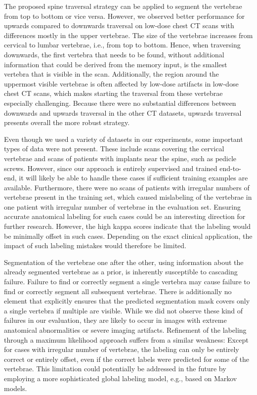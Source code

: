 \documentclass[authoryear,5p,final,times]{elsarticle}
\begin{document}
    The proposed spine traversal strategy can be applied to segment the vertebrae from top to bottom or vice versa. However, we observed better performance for upwards compared to downwards traversal on low-dose chest CT scans with differences mostly in the upper vertebrae. The size of the vertebrae increases from cervical to lumbar vertebrae, i.e., from top to bottom. Hence, when traversing downwards, the first vertebra that needs to be found, without additional information that could be derived from the memory input, is the smallest vertebra that is visible in the scan. Additionally, the region around the uppermost visible vertebrae is often affected by low-dose artifacts in low-dose chest CT scans, which makes starting the traversal from these vertebrae especially challenging. Because there were no substantial differences between downwards and upwards traversal in the other CT datasets, upwards traversal presents overall the more robust strategy.
    
    Even though we used a variety of datasets in our experiments, some important types of data were not present. These include scans covering the cervical vertebrae and scans of patients with implants near the spine, such as pedicle screws. However, since our approach is entirely supervised and trained end-to-end, it will likely be able to handle these cases if sufficient training examples are available. Furthermore, there were no scans of patients with irregular numbers of vertebrae present in the training set, which caused mislabeling of the vertebrae in one patient with irregular number of vertebrae in the evaluation set. Ensuring accurate anatomical labeling for such cases could be an interesting direction for further research. However, the high kappa scores indicate that the labeling would be minimally offset in such cases. Depending on the exact clinical application, the impact of such labeling mistakes would therefore be limited.
    
    Segmentation of the vertebrae one after the other, using information about the already segmented vertebrae as a prior, is inherently susceptible to cascading failure. Failure to find or correctly segment a single vertebra may cause failure to find or correctly segment all subsequent vertebrae. There is additionally no element that explicitly ensures that the predicted segmentation mask covers only a single vertebra if multiple are visible. While we did not observe these kind of failures in our evaluation, they are likely to occur in images with extreme anatomical abnormalities or severe imaging artifacts. Refinement of the labeling through a maximum likelihood approach suffers from a similar weakness: Except for cases with irregular number of vertebrae, the labeling can only be entirely correct or entirely offset, even if the correct labels were predicted for some of the vertebrae. This limitation could potentially be addressed in the future by employing a more sophisticated global labeling model, e.g., based on Markov models.
    
\end{document}
